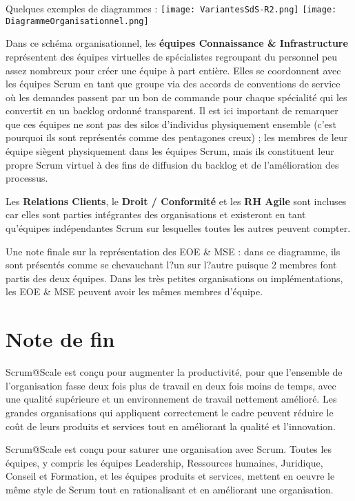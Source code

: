 \documentclass[12pt,a4paper,parskip=full]{scrartcl}
\begin{document}
Quelques exemples de diagrammes :
\texttt{[image: VariantesSdS-R2.png]}
\texttt{[image: DiagrammeOrganisationnel.png]}

Dans ce schéma organisationnel, les \textbf{équipes Connaissance \& Infrastructure}
représentent des équipes virtuelles de spécialistes regroupant du personnel peu assez
nombreux pour créer une équipe à part entière. Elles se coordonnent avec les équipes
Scrum en tant que groupe via des accords de conventions de service où les demandes
passent par un bon de commande pour chaque spécialité qui les convertit en un backlog
ordonné transparent. Il est ici important de remarquer que ces équipes ne sont pas des
silos d'individus physiquement ensemble (c'est pourquoi ils sont représentés comme des
pentagones creux) ; les membres de leur équipe siègent physiquement dans les équipes
Scrum, mais ils constituent leur propre Scrum virtuel à des fins de diffusion du backlog et
de l'amélioration des processus.

Les \textbf{Relations Clients}, le \textbf{Droit / Conformité} et les \textbf{RH Agile} sont incluses car elles sont
parties intégrantes des organisations et existeront en tant qu'équipes indépendantes
Scrum sur lesquelles toutes les autres peuvent compter.

Une note finale sur la représentation des EOE \& MSE : dans ce diagramme, ils sont
présentés comme se chevauchant l?un sur l?autre puisque 2 membres font partis des deux
équipes. Dans les très petites organisations ou implémentations, les EOE \& MSE peuvent
avoir les mêmes membres d'équipe.

\section{Note de fin}
Scrum@Scale est conçu pour augmenter la productivité, pour que l'ensemble de
l'organisation fasse deux fois plus de travail en deux fois moins de temps, avec une qualité
supérieure et un environnement de travail nettement amélioré. Les grandes organisations
qui appliquent correctement le cadre peuvent réduire le coût de leurs produits et services
tout en améliorant la qualité et l'innovation.

Scrum@Scale est conçu pour saturer une organisation avec Scrum. Toutes les équipes, y
compris les équipes Leadership, Ressources humaines, Juridique, Conseil et Formation,
et les équipes produits et services, mettent en oeuvre le même style de Scrum tout en
rationalisant et en améliorant une organisation.
\end{document}
